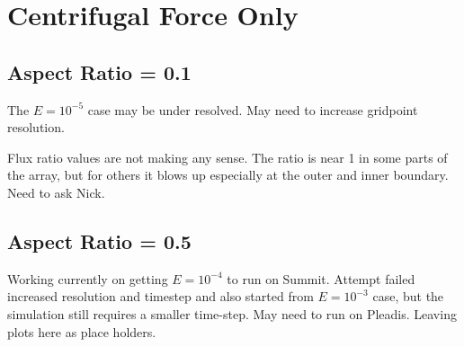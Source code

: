 \section{Centrifugal Force Only}

\subsection{Aspect Ratio = 0.1}

The $E=10^{-5}$ case may be under resolved. May need to increase gridpoint resolution. 

\keradius

\azavgtemperature

\azavgomega
 
\azavgmassflux

\fluxpol

\fluxeq

\condfluxrin

\condfluxrout

\clearpage

Flux ratio values are not making any sense. The ratio is near 1 in some parts of the array, but for others it blows up especially at the outer and inner boundary. Need to ask Nick.

\ekfixtable

\clearpage

\subsection{Aspect Ratio = 0.5}

Working currently on getting $E = 10^{-4}$ to run on Summit. Attempt failed increased resolution and timestep and also started from $E = 10^{-3}$ case, but the simulation still requires a smaller time-step. May need to run on Pleadis. Leaving plots here as place holders.

\keradiusarfive

\azavgtemperaturearfive

\azavgomegaarfive

\azavgmassfluxarfive

\centrifugaltablearfive

\clearpage

